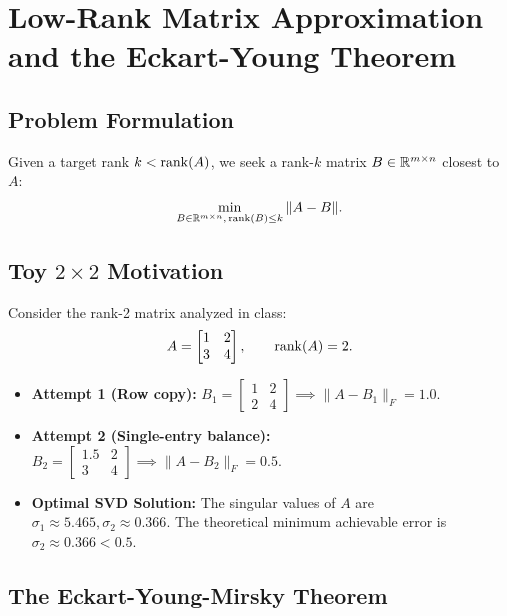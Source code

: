 \FloatBarrier
\section{Low-Rank Matrix Approximation and the Eckart-Young Theorem}
\label{sec:eckart-young-en}

\subsection{Problem Formulation}

Given a target rank $k < \operatorname{rank}(A)$, we seek a rank-$k$ matrix $B \in \mathbb{R}^{m \times n}$ closest to $A$:
\begin{equation}
    \min_{B \in \mathbb{R}^{m \times n}, \, \operatorname{rank}(B) \le k} \|A - B\|.
\end{equation}

\subsection{Toy $2 \times 2$ Motivation}

Consider the rank-2 matrix analyzed in class:
\begin{equation}
    A = \begin{bmatrix} 1 & 2 \\ 3 & 4 \end{bmatrix}, \qquad \operatorname{rank}(A) = 2.
\end{equation}
\begin{itemize}
    \item \textbf{Attempt 1 (Row copy):} $B_1 = \begin{bmatrix} 1 & 2 \\ 2 & 4 \end{bmatrix} \implies \|A - B_1\|_F = 1.0$.
    \item \textbf{Attempt 2 (Single-entry balance):} $B_2 = \begin{bmatrix} 1.5 & 2 \\ 3 & 4 \end{bmatrix} \implies \|A - B_2\|_F = 0.5$.
    \item \textbf{Optimal SVD Solution:} The singular values of $A$ are $\sigma_1 \approx 5.465, \sigma_2 \approx 0.366$. The theoretical minimum achievable error is $\sigma_2 \approx 0.366 < 0.5$.
\end{itemize}

\subsection{The Eckart-Young-Mirsky Theorem}

